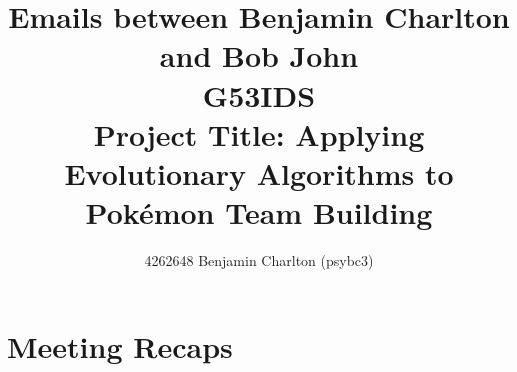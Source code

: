 \documentclass[a4paper]{article}
\newcommand{\Pokemon}{Pok\'{e}mon}
\begin{document}
\title{
    Emails between Benjamin Charlton and Bob John
    \\ \large{G53IDS}
    \\ \large{Project Title: Applying Evolutionary Algorithms to \Pokemon{} Team Building}\vspace{-3ex}}
\author{4262648 Benjamin Charlton (psybc3)}
\maketitle

\section{Meeting Recaps}
\end{document}
